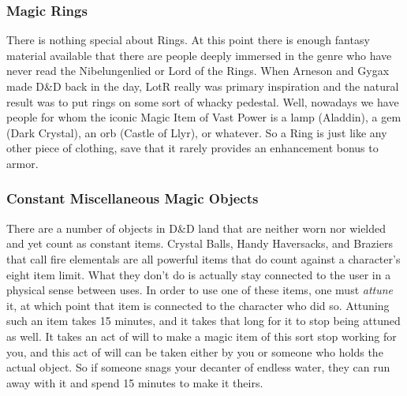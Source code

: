 \subsubsection{Magic Rings}
\vspace*{-8pt}

There is nothing special about Rings. At this point there is enough fantasy material available that there are people deeply immersed in the genre who have never read the Nibelungenlied or Lord of the Rings. When Arneson and Gygax made D\&D back in the day, LotR really was primary inspiration and the natural result was to put rings on some sort of whacky pedestal. Well, nowadays we have people for whom the iconic Magic Item of Vast Power is a lamp (Aladdin), a gem (Dark Crystal), an orb (Castle of Llyr), or whatever. So a Ring is just like any other piece of clothing, save that it rarely provides an enhancement bonus to armor.

\subsubsection{Constant Miscellaneous Magic Objects}

There are a number of objects in D\&D land that are neither worn nor wielded and yet count as constant items. Crystal Balls, Handy Haversacks, and Braziers that call fire elementals are all powerful items that do count against a character's eight item limit. What they don't do is actually stay connected to the user in a physical sense between uses. In order to use one of these items, one must \emph{attune} it, at which point that item is connected to the character who did so. Attuning such an item takes 15 minutes, and it takes that long for it to stop being attuned as well. It takes an act of will to make a magic item of this sort stop working for you, and this act of will can be taken either by you or someone who holds the actual object. So if someone snags your decanter of endless water, they can run away with it and spend 15 minutes to make it theirs.



